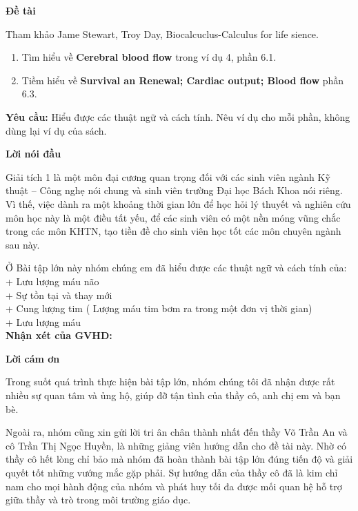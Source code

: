 \documentclass[12pt,a4paper]{article}
\begin{document}
\begin{center}
    \textbf{Đề tài}
\end{center}

Tham khảo Jame Stewart, Troy Day, Biocalcuclus-Calculus for life sience.
    \begin{enumerate} [1.]
            \item Tìm hiểu về \textbf{Cerebral blood flow} trong ví dụ 4, phần 6.1.
            \item Tiềm hiểu về \textbf{Survival an Renewal; Cardiac output; Blood flow} phần 6.3.
    \end{enumerate}

    
\textbf{Yêu cầu:} Hiểu được các thuật ngữ và cách tính. Nêu ví dụ cho mỗi phần, không dùng lại ví dụ của sách.
\newpage
\begin{center}
    \textbf{Lời nói đầu}
\end{center}

    Giải tích 1 là một môn đại cương quan trọng đối với các sinh viên ngành Kỹ thuật – Công nghẹ nói chung và sinh viên trường Đại học Bách Khoa nói riêng. Vì thế, việc dành ra một khoảng thời gian lớn để học hỏi lý thuyết và nghiên cứu môn học này là một điều tất yếu, để các sinh viên có một nền móng vũng chắc trong các môn KHTN, tạo tiền đề cho sinh viên học tốt các môn chuyên ngành sau này.\newline

    
Ở Bài tập lớn này nhóm chúng em đã hiểu được các thuật ngữ và cách tính của:\\
+ Lưu lượng máu não\\
+ Sự tồn tại và thay mới\\
+ Cung lượng tim ( Lượng máu tim bơm ra trong một đơn vị thời gian)\\
+ Lưu lượng máu \\


\textbf{Nhận xét của GVHD:}

\newpage
\begin{center}
    \textbf{Lời cám ơn}
\end{center}

Trong suốt quá trình thực hiện bài tập lớn, nhóm chúng tôi đã nhận được rất nhiều sự quan tâm và ủng hộ, giúp đỡ tận tình của thầy cô, anh chị em và bạn bè. 


Ngoài ra, nhóm cũng xin gửi lời tri ân chân thành nhất đến thầy Võ Trần An và cô Trần Thị Ngọc Huyền, là những giảng viên hướng dẫn cho đề tài  này. Nhờ có thầy cô hết lòng chỉ bảo mà nhóm đã hoàn thành bài tập lớn đúng tiến độ và giải quyết tốt những vướng mắc gặp phải. Sự hướng dẫn của thầy cô đã là kim chỉ nam cho mọi hành động của nhóm và phát huy tối đa được mối quan hệ hỗ trợ giữa thầy  và trò trong môi trường giáo dục. 
\end{document}
